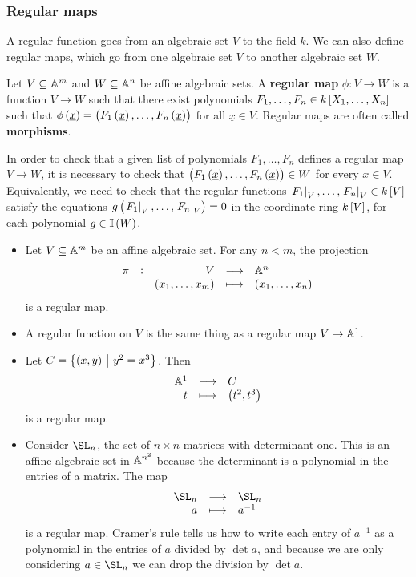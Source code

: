\subsubsection{Regular maps}

A regular function goes from an algebraic set $ V $ to the field $ k $. We can also define regular maps, which go from one algebraic set $ V $ to another algebraic set $ W $.

\begin{definition*}
Let $ V \subseteq \AA^m $ and $ W \subseteq \AA^n $ be affine algebraic sets. A \textbf{regular map} $ \phi : V \to W $ is a function $ V \to W $ such that there exist polynomials $ F_1, \dots, F_n \in k\sbr{X_1, \dots, X_n} $ such that $ \phi\br{\underline{x}} = \br{F_1\br{\underline{x}}, \dots, F_n\br{\underline{x}}} $ for all $ \underline{x} \in V $. Regular maps are often called \textbf{morphisms}.
\end{definition*}

\begin{note*}
In order to check that a given list of polynomials $ F_1, \dots, F_n $ defines a regular map $ V \to W $, it is necessary to check that $ \br{F_1\br{\underline{x}}, \dots, F_n\br{\underline{x}}} \in W $ for every $ \underline{x} \in V $. Equivalently, we need to check that the regular functions $ \eval{F_1}_V, \dots, \eval{F_n}_V \in k\sbr{V} $ satisfy the equations $ g\br{\eval{F_1}_V, \dots, \eval{F_n}_V} = 0 $ in the coordinate ring $ k\sbr{V} $, for each polynomial $ g \in \II\br{W} $.
\end{note*}

\pagebreak

\begin{example*}
\hfill
\begin{itemize}
\item Let $ V \subseteq \AA^m $ be an affine algebraic set. For any $ n < m $, the projection
$$ \function[\pi]{V}{\AA^n}{\br{x_1, \dots, x_m}}{\br{x_1, \dots, x_n}} $$
is a regular map.
\item A regular function on $ V $ is the same thing as a regular map $ V \to \AA^1 $.
\item Let $ C = \cbr{\br{x, y} \st y^2 = x^3} $. Then
$$ \function{\AA^1}{C}{t}{\br{t^2, t^3}} $$
is a regular map.
\item Consider $ \SL_n $, the set of $ n \times n $ matrices with determinant one. This is an affine algebraic set in $ \AA^{n^2} $ because the determinant is a polynomial in the entries of a matrix. The map
$$ \function{\SL_n}{\SL_n}{a}{a^{-1}} $$
is a regular map. Cramer's rule tells us how to write each entry of $ a^{-1} $ as a polynomial in the entries of $ a $ divided by $ \det a $, and because we are only considering $ a \in \SL_n $ we can drop the division by $ \det a $.
\end{itemize}
\end{example*}

